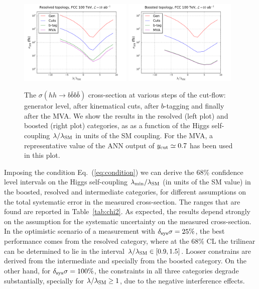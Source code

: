 \documentclass[a4paper,10pt]{article}
\newcommand{\lc}{\left[}
\newcommand{\rc}{\right]}
\begin{document}
\begin{figure}[t]
\begin{center}
\includegraphics[width=0.48\textwidth]{plots/res_xSec_100TeV.pdf}
\includegraphics[width=0.48\textwidth]{plots/bst_xSec_100TeV.pdf}
\caption{\small
  The $\sigma(hh\to b\bar{b}b\bar{b})$ cross-section at
  various steps of the cut-flow: generator level, after
  kinematical cuts, after $b$-tagging
  and finally after the MVA.
  We show the results
  in the resolved (left plot)
  and boosted (right plot) categories,
  as  as a function of the Higgs self-coupling
  $\lambda/\lambda_{\rm SM}$ in units of the SM coupling.
  For the MVA, a representative value of the ANN output of $y_{\rm cut}\simeq 0.7$
  has been used in this plot.
}
\label{fig:chi2}
\end{center}
\end{figure}

  Imposing the condition Eq.~(\ref{eq:condition}) we can derive the 68\% confidence level intervals
  on the Higgs self-coupling $\lambda_{\rm min}/\lambda_{\rm SM}$ (in units of the SM value) in the boosted, resolved and intermediate categories, for  different assumptions on the total systematic error in the measured
  cross-section.
  The ranges that are found are reported in Table~\ref{tab:chi2}.
  As expected, the results depend
  strongly on the assumption for the systematic uncertainty
  on the measured cross-section.
  In the optimistic scenario of a measurement with $\delta_{\rm sys}\sigma=25\%$,
  the best performance comes from the resolved category, where at the 68\% CL the trilinear
  can be determined to lie in the interval $\lambda/\lambda_{\rm SM}\in \lc 0.9, 1.5\rc$.
  Looser constrains are derived from the intermediate and specially from the boosted category.
  On the other hand, for $\delta_{\rm sys}\sigma=100\%$, the constraints in all three categories
  degrade substantially, specially for $\lambda/\lambda_{\rm SM}\ge 1$, due to the negative interference effects.
\end{document}
